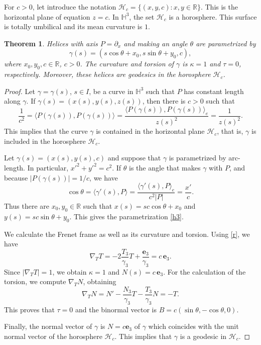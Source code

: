 \documentclass[a4paper,12pt]{amsart}
\newtheorem{theorem}{Theorem}[section]
\theoremstyle{definition}
\def\r{\mathbb R}
\def\h{\mathbb H}
\def\e{\mathbf e}
\begin{document}
 For $c>0$, let introduce the notation $\mathcal{H}_c=\{(x,y,c)\colon x,y\in\r\}$. This is the horizontal plane of equation $z=c$. In $\h^3$, the set $\mathcal{H}_c$ is a horosphere. This surface is totally umbilical and its mean curvature is $1$.
  
  
   
  \begin{theorem}\label{t33}
   Helices with axis $P=\partial_x$ and making an angle $\theta$ are parametrized by 
    \begin{equation}\label{h3}
  \gamma(s)=(s\cos\theta+x_0,s\sin\theta+y_0,c),
  \end{equation}
  where $x_0, y_0,c\in\r$, $c>0$.   The curvature and torsion of $\gamma$ is $\kappa=1$ and $\tau=0$, respectively.  Moreover, these helices are geodesics in the horosphere $\mathcal{H}_c$.  
\end{theorem}

\begin{proof}
   Let $\gamma=\gamma(s)$, $s\in I$, be a curve in $\h^3$ such that $P$ has constant length along $\gamma$. If $\gamma(s)=(x(s),y(s),z(s))$, then there is $c>0$ such that 
  $$\frac{1}{c^2}=\langle P(\gamma(s)),P(\gamma(s))\rangle=\frac{\langle P(\gamma(s)),P(\gamma(s))\rangle_e}{z(s)^2}=\frac{1}{z(s)^2}.$$
  This implies that the curve $\gamma$ is contained in the horizontal plane $\mathcal{H}_{c}$, that is,  $\gamma$ is included in the horosphere $\mathcal{H}_c$.
  
  
  Let $\gamma(s)=(x(s),y(s),c)$ and  suppose that $\gamma$ is parametrized by arc-length. In particular, $x'^2+y'^2=c^2$. If $\theta$ is the angle that makes $\gamma$ with $P$, and because $|P(\gamma(s))|=1/c$, we have 
  $$\cos\theta= \langle\gamma'(s),P\rangle =\frac{\langle\gamma'(s),P\rangle_e}{c^2|P|}=\frac{x'}{c}.$$
  Thus there are $x_0,y_0\in\r$ such that $x(s)=s c \cos\theta+x_0$ and $y(s)=sc \sin\theta+y_0$. This gives the parametrization \eqref{h3}.

  We calculate the Frenet frame as well as  its curvature and torsion. Using \eqref{r}, we have 
  $$\nabla_TT=-2\frac{T_3}{\gamma_3}T+\frac{\e_3}{\gamma_3}=c\,\e_3.$$
Since    $|\nabla_TT|=1$, we obtain $\kappa=1$ and $N(s)=c\,\e_3$. For the calculation of the torsion, we compute $\nabla_TN$, obtaining 
$$
  \nabla_TN=N'-\frac{N_3}{\gamma_3}T-\frac{T_3}{\gamma_3}N=-T.$$
This proves that $\tau=0$ and the binormal vector is $B=c(\sin\theta,-\cos\theta,0)$. 
 
 Finally,      the normal vector of $\gamma$ is $N=c\e_3$ of $\gamma$ which coincides with the unit normal vector of the horosphere $\mathcal{H}_c$. This implies that  $\gamma$ is a geodesic in $\mathcal{H}_c$. 
\end{proof}
 
\end{document}
